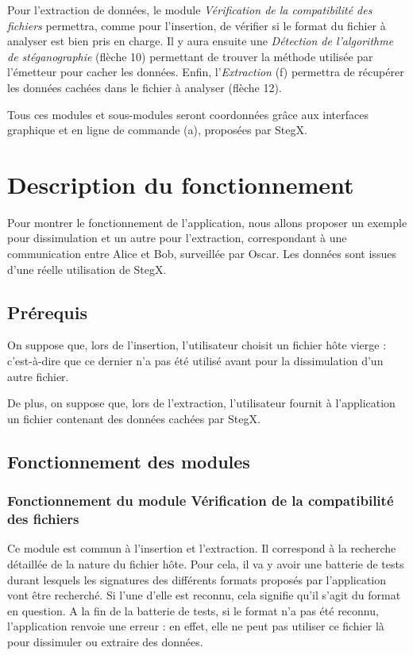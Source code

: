 \documentclass[11pt]{article}
\begin{document}
Pour l'extraction de données, le module \textit{Vérification de la compatibilité 
des fichiers} permettra, comme pour l'insertion, de vérifier si le format 
du fichier à analyser est bien pris en charge. 
Il y aura ensuite une \textit{Détection de l'algorithme de stéganographie} 
(flèche 10) permettant de trouver la méthode utilisée par l'émetteur pour 
cacher les données. 
Enfin, l'\textit{Extraction} (f) permettra de récupérer les données cachées 
dans le fichier à analyser (flèche 12). 

Tous ces modules et sous-modules seront coordonnées grâce aux interfaces 
graphique et en ligne de commande (a), proposées par StegX. 


\section{Description du fonctionnement}

Pour montrer le fonctionnement de l'application, nous allons proposer un 
exemple pour dissimulation et un autre pour l'extraction, correspondant 
à une communication entre Alice et Bob, surveillée par Oscar. 
Les données sont issues d'une réelle utilisation de StegX. 

\subsection{Prérequis}

On suppose que, lors de l'insertion, l'utilisateur choisit un fichier hôte
vierge : c'est-à-dire que ce dernier n'a pas été utilisé avant pour la 
dissimulation d'un autre fichier. 

De plus, on suppose que, lors de l'extraction, l'utilisateur fournit à 
l'application un fichier contenant des données cachées par StegX. 

\subsection{Fonctionnement des modules}

\subsubsection{Fonctionnement du module Vérification de la compatibilité des 
fichiers}

Ce module est commun à l'insertion et l'extraction. Il correspond à la 
recherche détaillée de la nature du fichier hôte. 
Pour cela, il va y avoir une batterie de tests durant lesquels les
signatures des différents formats proposés par l'application vont être recherché. 
Si l'une d'elle est reconnu, cela signifie qu'il s'agit du format en question. 
A la fin de la batterie de tests, si le format n'a pas été reconnu, 
l'application renvoie une erreur : en effet, elle ne peut pas utiliser ce 
fichier là pour dissimuler ou extraire des données. 
\end{document}
